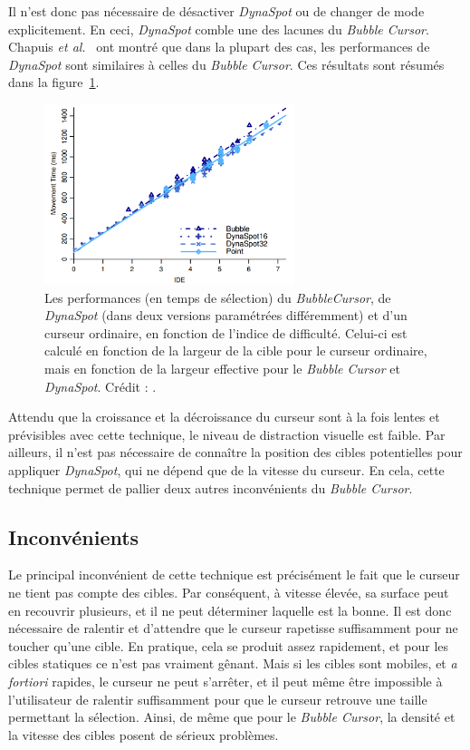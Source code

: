 	Il n'est donc pas nécessaire de désactiver \emph{DynaSpot} ou de changer de mode explicitement. En ceci, \emph{DynaSpot} comble une des lacunes du \emph{Bubble Cursor}. Chapuis \emph{et al.}~\cite{chapuis2009dynaspot} ont montré que dans la plupart des cas, les performances de \emph{DynaSpot} sont similaires à celles du \emph{Bubble Cursor}. Ces résultats sont résumés dans la figure~\ref{fig:dynaResults}.
	 
	\begin{figure}[!htb]
		\centering
		\includegraphics[width=0.65\textwidth]{figures/ch2/dynaResults}
		\caption[\emph{DynaSpot} -- performances]{Les performances (en temps de sélection) du \emph{BubbleCursor}, de \emph{DynaSpot} (dans deux versions paramétrées différemment) et d'un curseur ordinaire, en fonction de l'indice de difficulté. Celui-ci est calculé en fonction de la largeur de la cible pour le curseur ordinaire, mais en fonction de la largeur effective pour le \emph{Bubble Cursor} et \emph{DynaSpot}. Crédit : \cite{chapuis2009dynaspot}.}
		\label{fig:dynaResults}
	\end{figure}

	Attendu que la croissance et la décroissance du curseur sont à la fois lentes et prévisibles avec cette technique, le niveau de distraction visuelle est faible. Par ailleurs, il n'est pas nécessaire de connaître la position des cibles potentielles pour appliquer \emph{DynaSpot}, qui ne dépend que de la vitesse du curseur. En cela, cette technique permet de pallier deux autres inconvénients du \emph{Bubble Cursor}.

	\subsection{Inconvénients}
	Le principal inconvénient de cette technique est précisément le fait que le curseur ne tient pas compte des cibles. Par conséquent, à vitesse élevée, sa surface peut en recouvrir plusieurs, et il ne peut déterminer laquelle est la bonne. Il est donc nécessaire de ralentir et d'attendre que le curseur rapetisse suffisamment pour ne toucher qu'une cible. En pratique, cela se produit assez rapidement, et pour les cibles statiques ce n'est pas vraiment gênant. Mais si les cibles sont mobiles, et \emph{a fortiori} rapides, le curseur ne peut s'arrêter, et il peut même être impossible à l'utilisateur de ralentir suffisamment pour que le curseur retrouve une taille permettant la sélection. Ainsi, de même que pour le \emph{Bubble Cursor}, la densité et la vitesse des cibles posent de sérieux problèmes.

